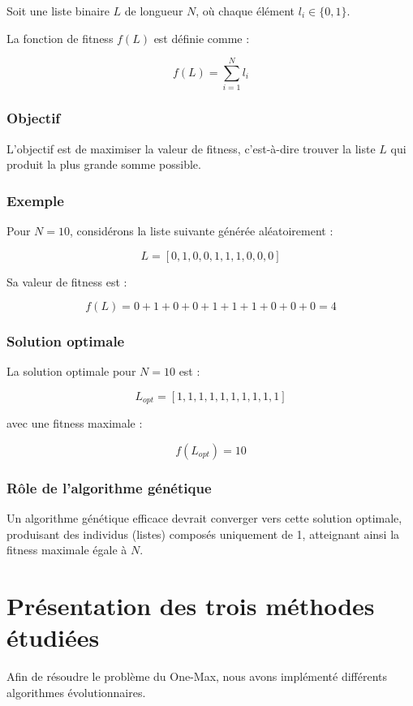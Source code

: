 \documentclass{article}
\begin{document}
Soit une liste binaire $L$ de longueur $N$, où chaque élément $l_i \in \{0,1\}$.

La fonction de fitness $f(L)$ est définie comme :

\[
f(L) = \sum_{i=1}^N l_i
\]

\subsubsection{Objectif}

L'objectif est de maximiser la valeur de fitness, c'est-à-dire trouver la liste $L$ qui produit la plus grande somme possible.

\subsubsection{Exemple}

Pour $N = 10$, considérons la liste suivante générée aléatoirement :

\[
L = [0, 1, 0, 0, 1, 1, 1, 0, 0, 0]
\]

Sa valeur de fitness est :

\[
f(L) = 0 + 1 + 0 + 0 + 1 + 1 + 1 + 0 + 0 + 0 = 4
\]

\subsubsection{Solution optimale}

La solution optimale pour $N = 10$ est :

\[
L_{opt} = [1, 1, 1, 1, 1, 1, 1, 1, 1, 1]
\]

avec une fitness maximale :

\[
f(L_{opt}) = 10
\]

\subsubsection{Rôle de l'algorithme génétique}

Un algorithme génétique efficace devrait converger vers cette solution optimale, produisant des individus (listes) composés uniquement de 1, atteignant ainsi la fitness maximale égale à $N$.

\section{Présentation des trois méthodes étudiées}
Afin de résoudre le problème du One-Max, nous avons implémenté différents algorithmes évolutionnaires.
\end{document}
